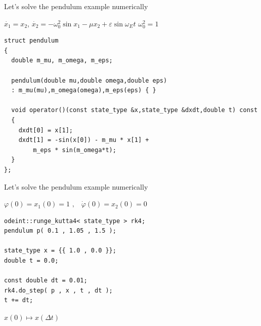 \begin{frame}[fragile]

\centerline{ \Large Let's solve the pendulum example numerically}

\vspace{2ex}

$\dot{x_1} = x_2$, $\dot{x_2} = - \omega_0^2 \sin x_1 - \mu x_2 + \varepsilon \sin \omega_E t$ \hspace{6ex} $\omega_0^2 = 1$

\vspace{2ex}

\begin{lstlisting}
struct pendulum
{
  double m_mu, m_omega, m_eps;

  pendulum(double mu,double omega,double eps)
  : m_mu(mu),m_omega(omega),m_eps(eps) { }

  void operator()(const state_type &x,state_type &dxdt,double t) const
  {
    dxdt[0] = x[1];
    dxdt[1] = -sin(x[0]) - m_mu * x[1] +
        m_eps * sin(m_omega*t);
  }
};
\end{lstlisting}

\end{frame}

\begin{frame}[fragile]
 \centerline{ \Large Let's solve the pendulum example numerically}

\vspace{2ex}
$\varphi(0) = x_1(0) = 1 \,\, \text{,} \quad \dot{\varphi}(0) = x_2(0) = 0$
\vspace{2ex}

\begin{lstlisting}
odeint::runge_kutta4< state_type > rk4;
pendulum p( 0.1 , 1.05 , 1.5 );

state_type x = {{ 1.0 , 0.0 }};
double t = 0.0;

const double dt = 0.01;
rk4.do_step( p , x , t , dt );
t += dt;
\end{lstlisting}

\vspace{2ex}

\centerline{$x(0) \mapsto x(\Delta t)$}

\end{frame}


